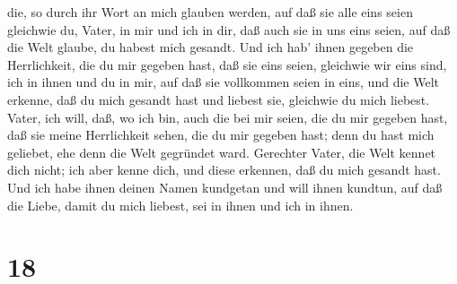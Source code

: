 die, so durch ihr Wort an mich glauben werden,  auf daß sie
alle eins seien gleichwie du, Vater, in mir und ich in dir, daß auch sie
in uns eins seien, auf daß die Welt glaube, du habest mich gesandt.
 Und ich hab' ihnen gegeben die Herrlichkeit, die du mir
gegeben hast, daß sie eins seien, gleichwie wir eins sind, 
ich in ihnen und du in mir, auf daß sie vollkommen seien in eins, und
die Welt erkenne, daß du mich gesandt hast und liebest sie, gleichwie du
mich liebest.  Vater, ich will, daß, wo ich bin, auch die
bei mir seien, die du mir gegeben hast, daß sie meine Herrlichkeit
sehen, die du mir gegeben hast; denn du hast mich geliebet, ehe denn die
Welt gegründet ward.  Gerechter Vater, die Welt kennet dich
nicht; ich aber kenne dich, und diese erkennen, daß du mich gesandt
hast.  Und ich habe ihnen deinen Namen kundgetan und will
ihnen kundtun, auf daß die Liebe, damit du mich liebest, sei in ihnen
und ich in ihnen.

\hypertarget{section-17}{%
\section{18}\label{section-17}}


